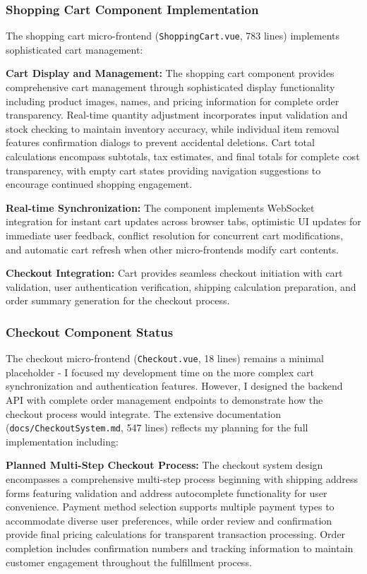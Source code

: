 \documentclass[12pt,a4paper]{report}
\begin{document}
\subsubsection{Shopping Cart Component Implementation}

The shopping cart micro-frontend (\texttt{ShoppingCart.vue}, 783 lines) implements sophisticated cart management:

\textbf{Cart Display and Management:} The shopping cart component provides comprehensive cart management through sophisticated display functionality including product images, names, and pricing information for complete order transparency. Real-time quantity adjustment incorporates input validation and stock checking to maintain inventory accuracy, while individual item removal features confirmation dialogs to prevent accidental deletions. Cart total calculations encompass subtotals, tax estimates, and final totals for complete cost transparency, with empty cart states providing navigation suggestions to encourage continued shopping engagement.

\textbf{Real-time Synchronization:} The component implements WebSocket integration for instant cart updates across browser tabs, optimistic UI updates for immediate user feedback, conflict resolution for concurrent cart modifications, and automatic cart refresh when other micro-frontends modify cart contents.

\textbf{Checkout Integration:} Cart provides seamless checkout initiation with cart validation, user authentication verification, shipping calculation preparation, and order summary generation for the checkout process.

\subsubsection{Checkout Component Status}

The checkout micro-frontend (\texttt{Checkout.vue}, 18 lines) remains a minimal placeholder - I focused my development time on the more complex cart synchronization and authentication features. However, I designed the backend API with complete order management endpoints to demonstrate how the checkout process would integrate. The extensive documentation (\texttt{docs/CheckoutSystem.md}, 547 lines) reflects my planning for the full implementation including:

\textbf{Planned Multi-Step Checkout Process:} The checkout system design encompasses a comprehensive multi-step process beginning with shipping address forms featuring validation and address autocomplete functionality for user convenience. Payment method selection supports multiple payment types to accommodate diverse user preferences, while order review and confirmation provide final pricing calculations for transparent transaction processing. Order completion includes confirmation numbers and tracking information to maintain customer engagement throughout the fulfillment process.
\end{document}

